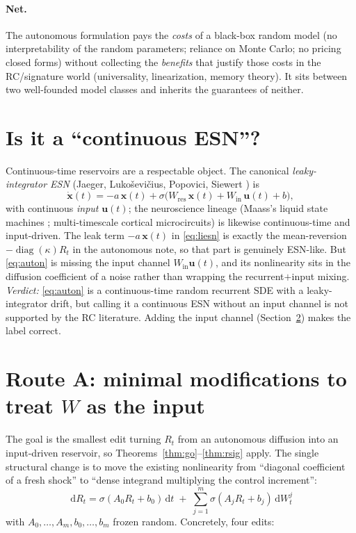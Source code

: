 \documentclass[11pt]{article}
\theoremstyle{definition}
\theoremstyle{plain}
\newcommand{\diag}{\operatorname{diag}}
\newcommand{\dd}{\,\mathrm{d}}
\begin{document}
\paragraph{Net.} The autonomous formulation pays the \emph{costs} of a black-box random model (no interpretability of the random parameters; reliance on Monte Carlo; no pricing closed forms) without collecting the \emph{benefits} that justify those costs in the RC/signature world (universality, linearization, memory theory). It sits between two well-founded model classes and inherits the guarantees of neither.

\section{Is it a ``continuous ESN''?}
\label{sec:cont-esn}

Continuous-time reservoirs are a respectable object. The canonical \emph{leaky-integrator ESN} (Jaeger, Luko\v{s}evi\v{c}ius, Popovici, Siewert \cite{jaeger2007}) is
\begin{equation}
\label{eq:liesn}
\dot{\mathbf{x}}(t) = -a\,\mathbf{x}(t) + \sigma\!\big(W_{\mathrm{res}}\,\mathbf{x}(t) + W_{\mathrm{in}}\,\mathbf{u}(t) + b\big),
\end{equation}
with continuous \emph{input} $\mathbf{u}(t)$; the neuroscience lineage (Maass's liquid state machines \cite{maass2002}; multi-timescale cortical microcircuits) is likewise continuous-time and input-driven. The leak term $-a\,\mathbf{x}(t)$ in \eqref{eq:liesn} is exactly the mean-reversion $-\diag(\kappa)R_t$ in the autonomous note, so that part is genuinely ESN-like. But \eqref{eq:auton} is missing the input channel $W_{\mathrm{in}}\mathbf{u}(t)$, and its nonlinearity sits in the diffusion coefficient of a noise rather than wrapping the recurrent$+$input mixing. \emph{Verdict:} \eqref{eq:auton} is a continuous-time random recurrent SDE with a leaky-integrator drift, but calling it a continuous ESN without an input channel is not supported by the RC literature. Adding the input channel (Section~\ref{sec:routeA}) makes the label correct.

\section{Route A: minimal modifications to treat $W$ as the input}
\label{sec:routeA}

The goal is the smallest edit turning $R_t$ from an autonomous diffusion into an input-driven reservoir, so Theorems~\ref{thm:go}--\ref{thm:rsig} apply. The single structural change is to move the existing nonlinearity from ``diagonal coefficient of a fresh shock'' to ``dense integrand multiplying the control increment'':
\begin{equation}
\label{eq:routeA}
\boxed{\;\dd R_t = \sigma\!\left(A_0 R_t + b_0\right)\dd t \;+\; \sum_{j=1}^{m}\sigma\!\left(A_j R_t + b_j\right)\dd W^j_t\;}
\end{equation}
with $A_0,\dots,A_m,b_0,\dots,b_m$ frozen random. Concretely, four edits:
\end{document}
